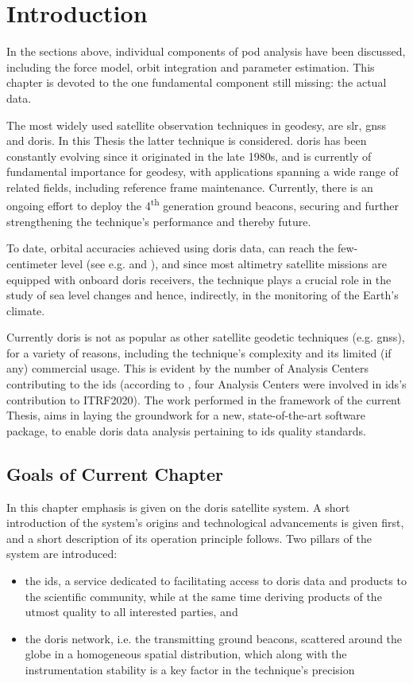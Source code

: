 \section{Introduction}\label{sec:doris-introduction}
In the sections above, individual components of \gls{pod} analysis have been 
discussed, including the force model, orbit integration and parameter estimation. 
This chapter is devoted to the one fundamental component still missing: the actual data.

The most widely used satellite observation techniques in geodesy, 
are \gls{slr}, \gls{gnss} and \gls{doris}. In this Thesis the latter technique 
is considered. \gls{doris} has been constantly evolving since it originated in the 
late 1980s, and is currently of fundamental importance for geodesy, with applications 
spanning a wide range of related fields, including reference frame maintenance. 
Currently, there is an ongoing effort to deploy the 4\textsuperscript{th} generation 
ground beacons, securing and further strengthening the technique's performance and 
thereby future.

To date, orbital accuracies achieved using \gls{doris} data, can reach the few-centimeter 
level (see e.g. \cite{Rudenko2023} and \cite{Kong2017}), and since most altimetry satellite missions 
are equipped with onboard \gls{doris} receivers, the technique plays a crucial role in 
the study of sea level changes and hence, indirectly, in the monitoring of the Earth's 
climate.

Currently \gls{doris} is not as popular as other satellite geodetic techniques (e.g. 
\gls{gnss}), for a variety of reasons, including the technique's complexity and 
its limited (if any) commercial usage. This is evident by the number of Analysis 
Centers contributing to the \gls{ids} (according to \cite{Moreaux2022}, four Analysis Centers 
were involved in \gls{ids}'s contribution to ITRF2020). The work performed in the 
framework of the current Thesis, aims in laying the groundwork for a new, state-of-the-art 
software package, to enable \gls{doris} data analysis pertaining to \gls{ids} 
quality standards.

\subsection{Goals of Current Chapter}
In this chapter emphasis is given on the \gls{doris} satellite system. A short 
introduction of the system's origins and technological advancements is given first, and a short 
description of its operation principle follows. Two pillars of the system are 
introduced: 
\begin{itemize}
  \item the \gls{ids}, a service dedicated to facilitating access to \gls{doris} 
data and products to the scientific community, while at the same time deriving products 
of the utmost quality to all interested parties, and 
  \item the \gls{doris} network, i.e. the transmitting ground beacons, scattered around the 
globe in a homogeneous spatial distribution, which along with the instrumentation stability 
is a key factor in the technique's precision
\end{itemize}

